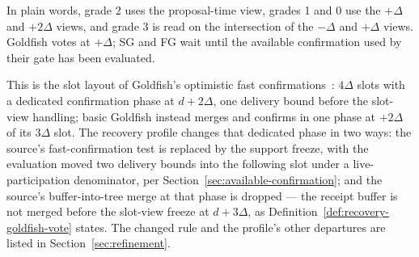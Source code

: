 \begin{definition}
In plain words, grade 2 uses the proposal-time view, grades 1 and 0 use
the \(+\Delta\) and \(+2\Delta\) views, and grade 3 is read on the
intersection of the \(-\Delta\) and \(+\Delta\) views.  Goldfish votes at \(+\Delta\); SG and FG
wait until the available confirmation used by their gate has been evaluated.
\end{definition}

This is the slot layout of Goldfish's optimistic fast
confirmations~\cite{goldfish}: \(4\Delta\) slots with a dedicated
confirmation phase at \(d+2\Delta\), one delivery bound before the
slot-view handling; basic Goldfish instead merges and confirms in one
phase at \(+2\Delta\) of its \(3\Delta\) slot.  The recovery profile
changes that dedicated phase in two ways: the source's fast-confirmation
test is replaced by the support freeze, with the evaluation moved two
delivery bounds into the following slot under a live-participation
denominator, per Section~\ref{sec:available-confirmation}; and the
source's buffer-into-tree merge at that phase is dropped --- the receipt
buffer is not merged before the slot-view freeze at \(d+3\Delta\), as
Definition~\ref{def:recovery-goldfish-vote} states.  The changed rule and the
profile's other departures are listed in Section~\ref{sec:refinement}.

